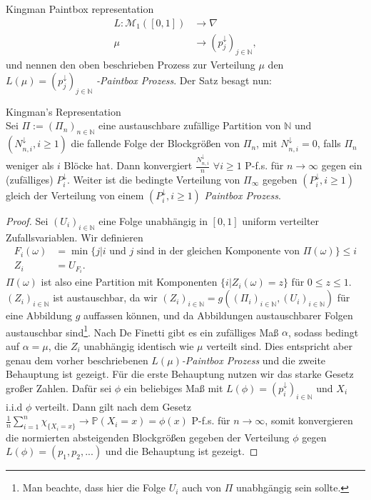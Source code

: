 \begin{section}{Kingman Paintbox representation}
\begin{align*}
L: \mathcal{M}_1([0,1]) &\to \nabla \\
\mu \hspace{20pt} &\to (p_j^\downarrow)_{j \in \mathbb{N}},
\end{align*}
und nennen den oben beschrieben Prozess zur Verteilung $\mu$ den $L(\mu) = (p_j^\downarrow)_{j \in \mathbb{N}}$ \textit{-Paintbox Prozess}. Der Satz besagt nun:
\begin{theorem}
\textnormal{Kingman's Representation} \label{Kingmans representation}\\
    Sei $\Pi := (\Pi_n)_{n \in \mathbb{N}}$ eine austauschbare zufällige Partition von $\mathbb{N}$ und $(N^{\downarrow}_{n,i}, i \geq 1)$ die fallende Folge der Blockgrößen von $\Pi_n$, mit $N_{n,i}^\downarrow = 0$, falls $\Pi_n$ weniger als $i$ Blöcke hat. Dann konvergiert $\frac{N_{n,i}^\downarrow}{n} $ $ \forall i \geq 1$ P-f.s. für $n \to \infty$ gegen ein (zufälliges) $P^\downarrow_i$. Weiter ist die bedingte Verteilung von $\Pi_\infty$ gegeben $(P_i^\downarrow, i \geq 1)$ gleich der Verteilung von einem $(P_i^\downarrow, i \geq 1)$ \textit{Paintbox Prozess}.
\end{theorem}
\begin{proof}
Sei $(U_i)_{i \in \mathbb{N}}$ eine Folge unabhängig in $[0,1]$ uniform verteilter Zufallsvariablen. Wir definieren 
\begin{align*}
F_i(\omega) &= \min{\{j| i \text{ und } j \text{ sind in der gleichen Komponente von }  \Pi(\omega)\}} \leq i \\
Z_i &= U_{F_i}.
\end{align*}
$\Pi(\omega)$ ist also eine Partition mit Komponenten $\{i| Z_i(\omega) = z\}$ für $0 \leq z \leq 1$. $(Z_i)_{i \in \mathbb{N}}$ ist austauschbar, da wir $(Z_i)_{i \in \mathbb{N}} = g((\Pi_i)_{i \in \mathbb{N}},(U_i)_{i \in \mathbb{N}})$ für eine Abbildung $g$ auffassen können, und da Abbildungen austauschbarer Folgen austauschbar sind\footnote{Man beachte, dass hier die Folge $U_i$ auch von $\Pi$ unabhgängig sein sollte.}. Nach De Finetti gibt es ein zufälliges Maß $\alpha$, sodass bedingt auf $\alpha = \mu$, die $Z_i$ unabhängig identisch wie $\mu$ verteilt sind. Dies entspricht aber genau dem vorher beschriebenen $L(\mu)$\textit{-Paintbox Prozess} und die zweite Behauptung ist gezeigt. Für die erste Behauptung nutzen wir das starke Gesetz großer Zahlen. Dafür sei $\phi$ ein beliebiges Maß mit $L(\phi) = (p^\downarrow_i)_{i \in \mathbb{N}}$ und $X_i$ i.i.d $\phi$ verteilt. Dann gilt nach dem Gesetz $\frac{1}{n}\sum_{i=1}^{n}\chi_{\{X_i = x\}} \rightarrow \mathbb{P}(X_i = x) = \phi(x)$ P-f.s. für $n \to \infty$, somit konvergieren die normierten absteigenden Blockgrößen gegeben der Verteilung $\phi$ gegen $L(\phi) = (p_1,p_2,...)$ und die Behauptung ist gezeigt.
\end{proof}

\end{section}